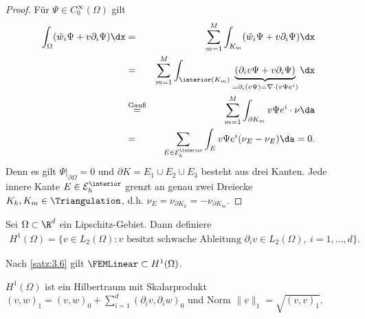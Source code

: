 \begin{proof}
    Für $\Psi \in C_0^\infty(\Omega)$ gilt
    \begin{eqnarray*}
            \int_\Omega (\tilde{w}_i \Psi + v \partial_i \Psi) \dx
        &=& \sum_{m=1}^M \int_{K_m} (\tilde{w}_i \Psi + v \partial_i \Psi)\dx \\
        &=& \sum_{m=1}^M \int_{\interior(K_m)} \underbrace{(\partial_i v \Psi
            + v \partial_i \Psi)}_{= \partial_i (v \Psi) = \nabla \cdot (v \Psi
            e^i)}\dx \\
        &\stackrel{\text{Gauß}}{=}&
            \sum_{m=1}^M \int_{\partial K_m} v \Psi e^i \cdot \nu \da \\
        &=& \sum_{E\in\mathcal{E}_h^{\interior}} \int_E v \Psi e^i
            (\nu_E - \nu_E) \da
        =  0.
    \end{eqnarray*}
    Denn es gilt $\Psi|_{\partial \Omega} = 0$ und $\partial K = E_1 \cup E_2 \cup E_3$
    besteht aus drei Kanten. Jede innere Kante
    $E \in \mathcal{E}_h^{\interior}$ grenzt an genau zwei Dreiecke $K_k,K_m \in \Triangulation$,
    d.h. $\nu_E = \nu_{\partial K_k} = - \nu_{\partial K_m}$.
\end{proof}


\begin{Definition}
    \label{def:3.7}
    Sei $\Omega \subset \R^d$ ein Lipschitz-Gebiet. Dann definiere
    \begin{eqnarray*}
        H^1(\Omega) = \{v \in L_2(\Omega): v \text{ besitzt schwache
	Ableitung } \partial_i v \in L_2(\Omega),\ i=1,\dots,d\}.
    \end{eqnarray*}
\end{Definition}


\begin{Bemerkung}
    Nach \eqref{satz:3.6} gilt $\FEMLinear \subset H^1(\Omega)$.
\end{Bemerkung}


\begin{Satz}
    \label{satz:3.8}
    $H^1(\Omega)$ ist ein Hilbertraum mit Skalarprodukt
    $(v, w)_1 = (v, w)_0 + \sum_{i=1}^d (\partial_i v, \partial_i w)_0$
    und Norm $\|v\|_1 = \sqrt{(v, v)_1}$.
\end{Satz}


